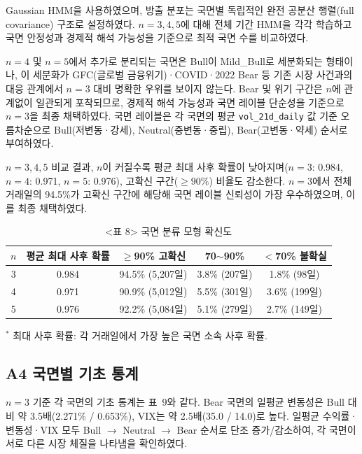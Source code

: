 \documentclass{article}
\begin{document}
Gaussian HMM을 사용하였으며, 방출 분포는 국면별 독립적인 완전 공분산 행렬(full covariance) 구조로 설정하였다. $n = 3, 4, 5$에 대해 전체 기간 HMM을 각각 학습하고 국면 안정성과 경제적 해석 가능성을 기준으로 최적 국면 수를 비교하였다.

$n = 4$ 및 $n = 5$에서 추가로 분리되는 국면은 Bull이 Mild\_Bull로 세분화되는 형태이나, 이 세분화가 GFC(글로벌 금융위기)·COVID·2022 Bear 등 기존 시장 사건과의 대응 관계에서 $n = 3$ 대비 명확한 우위를 보이지 않는다. Bear 및 위기 구간은 $n$에 관계없이 일관되게 포착되므로, 경제적 해석 가능성과 국면 레이블 단순성을 기준으로 $n = 3$을 최종 채택하였다. 국면 레이블은 각 국면의 평균 \texttt{vol\_21d\_daily} 값 기준 오름차순으로 Bull(저변동·강세), Neutral(중변동·중립), Bear(고변동·약세) 순서로 부여하였다.

$n = 3, 4, 5$ 비교 결과, $n$이 커질수록 평균 최대 사후 확률이 낮아지며($n=3$: 0.984, $n=4$: 0.971, $n=5$: 0.976), 고확신 구간($\geq 90\%$) 비율도 감소한다. $n = 3$에서 전체 거래일의 94.5\%가 고확신 구간에 해당해 국면 레이블 신뢰성이 가장 우수하였으며, 이를 최종 채택하였다.

\begin{table}[ht]
\centering
\caption{<표 8> 국면 분류 모형 확신도}
\label{tab:a1_confidence}
\begin{tabular}{ccccc}
\toprule
\textbf{$n$} & \textbf{평균 최대 사후 확률} & \textbf{$\geq$90\% 고확신} & \textbf{70$\sim$90\%} & \textbf{$<$70\% 불확실} \\
\midrule
3 & 0.984 & 94.5\% (5,207일) & 3.8\% (207일) & 1.8\% (98일) \\
4 & 0.971 & 90.9\% (5,012일) & 5.5\% (301일) & 3.6\% (199일) \\
5 & 0.976 & 92.2\% (5,084일) & 5.1\% (279일) & 2.7\% (149일) \\
\bottomrule
\end{tabular}
\begin{flushleft}
{\small $^*$ 최대 사후 확률: 각 거래일에서 가장 높은 국면 소속 사후 확률.}
\end{flushleft}
\end{table}

\subsection*{A4 국면별 기초 통계}

$n = 3$ 기준 각 국면의 기초 통계는 표~9와 같다. Bear 국면의 일평균 변동성은 Bull 대비 약 3.5배(2.271\% / 0.653\%), VIX는 약 2.5배(35.0 / 14.0)로 높다. 일평균 수익률·변동성·VIX 모두 Bull $\rightarrow$ Neutral $\rightarrow$ Bear 순서로 단조 증가/감소하여, 각 국면이 서로 다른 시장 체질을 나타냄을 확인하였다.
\end{document}
